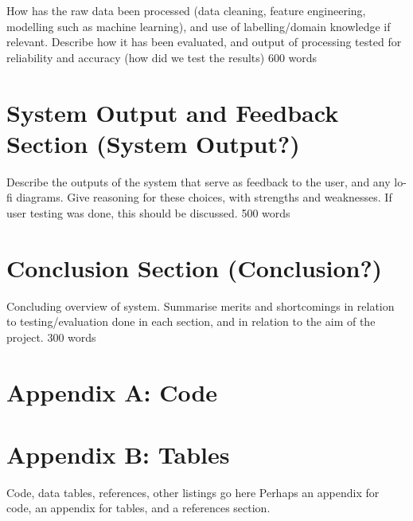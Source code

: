 \documentclass[]{article}
\begin{document}
	How has the raw data been processed (data cleaning, feature engineering, modelling such as machine learning), and use of labelling/domain knowledge if relevant. Describe how it has been evaluated, and output of processing tested for reliability and accuracy (how did we test the results)
	600 words
	
\section{System Output and Feedback Section (System Output?)}

	Describe the outputs of the system that serve as feedback to the user, and any lo-fi diagrams. Give reasoning for these choices, with strengths and weaknesses. If user testing was done, this should be discussed.
	500 words
	
\section{Conclusion Section (Conclusion?)}

	Concluding overview of system. Summarise merits and shortcomings in relation to testing/evaluation done in each section, and in relation to the aim of the project.
	300 words
	
\appendix

\section{Appendix A: Code}

\section{Appendix B: Tables}


	Code, data tables, references, other listings go here
	Perhaps an appendix for code, an appendix for tables, and a references section.
\end{document}
